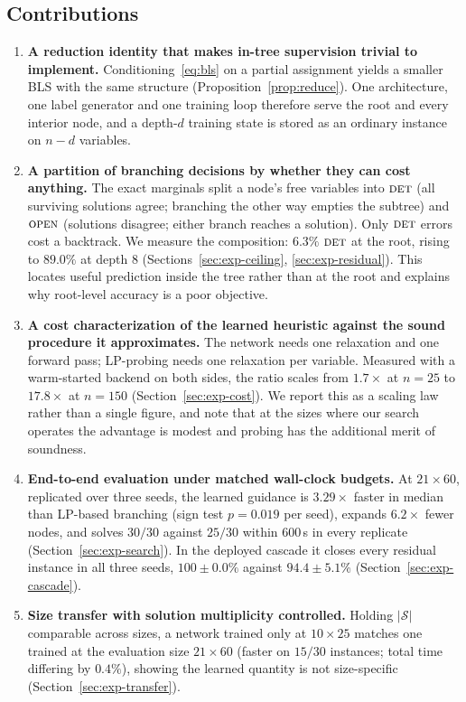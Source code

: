\documentclass[11pt]{article}
\newcommand{\SOL}{\mathcal{S}}
\newcommand{\FORCED}{\textsc{det}}
\newcommand{\FREE}{\textsc{open}}
\begin{document}
\subsection{Contributions}

\begin{enumerate}
\item \textbf{A reduction identity that makes in-tree supervision trivial to implement.} Conditioning~\eqref{eq:bls} on a partial assignment yields a smaller BLS with the same structure (Proposition~\ref{prop:reduce}). One architecture, one label generator and one training loop therefore serve the root and every interior node, and a depth-$d$ training state is stored as an ordinary instance on $n-d$ variables.

\item \textbf{A partition of branching decisions by whether they can cost anything.} The exact marginals split a node's free variables into $\FORCED$ (all surviving solutions agree; branching the other way empties the subtree) and $\FREE$ (solutions disagree; either branch reaches a solution). Only $\FORCED$ errors cost a backtrack. We measure the composition: $6.3\%$ $\FORCED$ at the root, rising to $89.0\%$ at depth $8$ (Sections~\ref{sec:exp-ceiling}, \ref{sec:exp-residual}). This locates useful prediction inside the tree rather than at the root and explains why root-level accuracy is a poor objective.

\item \textbf{A cost characterization of the learned heuristic against the sound procedure it approximates.} The network needs one relaxation and one forward pass; LP-probing needs one relaxation per variable. Measured with a warm-started backend on both sides, the ratio scales from $1.7\times$ at $n=25$ to $17.8\times$ at $n=150$ (Section~\ref{sec:exp-cost}). We report this as a scaling law rather than a single figure, and note that at the sizes where our search operates the advantage is modest and probing has the additional merit of soundness.

\item \textbf{End-to-end evaluation under matched wall-clock budgets.} At $21\times60$, replicated over three seeds, the learned guidance is $3.29\times$ faster in median than LP-based branching (sign test $p=0.019$ per seed), expands $6.2\times$ fewer nodes, and solves $30/30$ against $25/30$ within $600$\,s in every replicate (Section~\ref{sec:exp-search}). In the deployed cascade it closes every residual instance in all three seeds, $100\pm0.0\%$ against $94.4\pm5.1\%$ (Section~\ref{sec:exp-cascade}).

\item \textbf{Size transfer with solution multiplicity controlled.} Holding $|\SOL|$ comparable across sizes, a network trained only at $10\times25$ matches one trained at the evaluation size $21\times60$ (faster on $15/30$ instances; total time differing by $0.4\%$), showing the learned quantity is not size-specific (Section~\ref{sec:exp-transfer}).
\end{enumerate}
\end{document}
